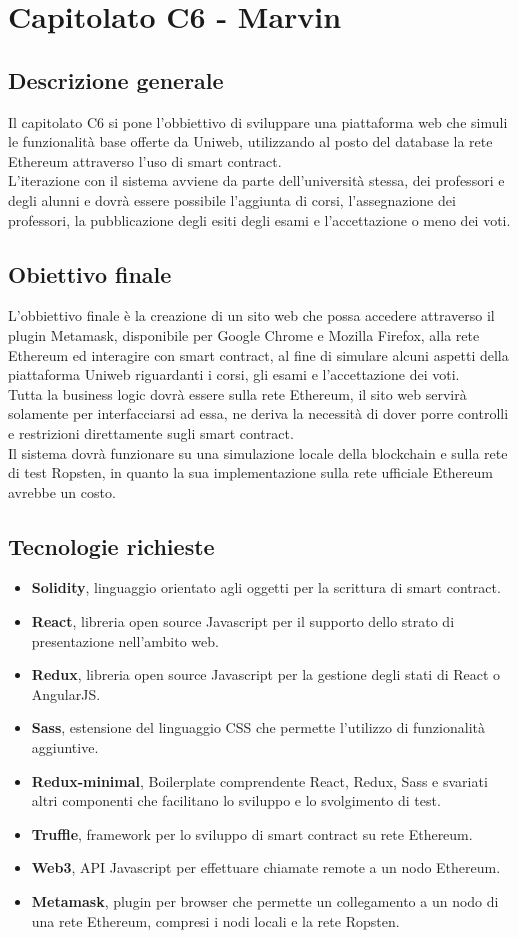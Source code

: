 \documentclass[main.tex]{subfiles}
\begin{document}
\chapter{Capitolato C6 - Marvin}
\section{Descrizione generale}
Il capitolato C6 si pone l'obbiettivo di sviluppare una piattaforma web che simuli le funzionalità base offerte da Uniweb, utilizzando al posto del database la rete Ethereum attraverso l'uso di smart contract.\\
L'iterazione con il sistema avviene da parte dell'università stessa, dei professori e degli alunni e dovrà essere possibile l'aggiunta di corsi, l'assegnazione dei professori, la pubblicazione degli esiti degli esami e l'accettazione o meno dei voti.
\section{Obiettivo finale}
L'obbiettivo finale è la creazione di un sito web che possa accedere attraverso il plugin Metamask, disponibile per Google Chrome e Mozilla Firefox, alla rete Ethereum ed interagire con smart contract, al fine di simulare alcuni aspetti della piattaforma Uniweb riguardanti i corsi, gli esami e l'accettazione dei voti.\\
Tutta la business logic dovrà essere sulla rete Ethereum, il sito web servirà solamente per interfacciarsi ad essa, ne deriva la necessità di dover porre controlli e restrizioni direttamente sugli smart contract.\\
Il sistema dovrà funzionare su una simulazione locale della blockchain e sulla rete di test Ropsten, in quanto la sua implementazione sulla rete ufficiale Ethereum avrebbe un costo.
\section{Tecnologie richieste}
\begin{itemize}
	\item \textbf{Solidity}, linguaggio orientato agli oggetti per la scrittura di smart contract.
	\item \textbf{React}, libreria open source Javascript per il supporto dello strato di presentazione nell'ambito web.
	\item \textbf{Redux}, libreria open source Javascript per la gestione degli stati di React o AngularJS.
	\item \textbf{Sass}, estensione del linguaggio CSS che permette l'utilizzo di funzionalità aggiuntive.
	\item \textbf{Redux-minimal}, Boilerplate comprendente React, Redux, Sass e svariati altri componenti che facilitano lo sviluppo e lo svolgimento di test.
	\item \textbf{Truffle}, framework per lo sviluppo di smart contract su rete Ethereum.
	\item \textbf{Web3}, API Javascript per effettuare chiamate remote a un nodo Ethereum.
	\item \textbf{Metamask}, plugin per browser che permette un collegamento a un nodo di una rete Ethereum, compresi i nodi locali e la rete Ropsten.
\end{itemize}
\end{document}
